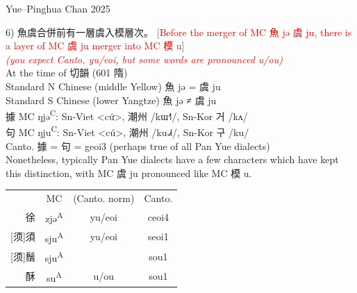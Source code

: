 \documentclass{beamer}
\begin{document}
\begin{frame}[fragile]{Yue–Pinghua \scriptsize{Chan 2025}}

{\small
6) 魚虞合併前有一層虞入模層次。
\textcolor{red}{[Before the merger of MC 魚 jə 虞 ju, there is a layer of MC 虞 ju merger into MC 模 u]\\ \textit{\scriptsize(you expect Canto. yu/eoi, but some words are pronounced u/ou)}}\\
\smallskip
At the time of 切韻 (601 隋)\\
    \quad Standard N Chinese (middle Yellow) 魚 jə = 虞 ju\\
    \quad Standard S Chinese (lower Yangtze) 魚 jə ≠ 虞 ju\\ 
\smallskip
據 MC ŋjə\textsuperscript{C}: Sn-Viet <cứ>, 潮州 /kɯ˧˥/, Sn-Kor 거 /kʌ/\\
句 MC ŋju\textsuperscript{C}: Sn-Viet <cú>, 潮州 /ku˨˩˧/, Sn-Kor 구 /ku/\\ 
\smallskip
Canto. 據 = 句 = geoi3 {\scriptsize(perhaps true of all Pan Yue dialects)}\\
Nonetheless, typically Pan Yue dialects have a few characters which have kept this distinction, with MC 虞 ju pronounced like MC 模 u.\\
\begin{table}
    \flushleft
    \begin{tabular}{r|c c c}
          & MC & (Canto. norm) & Canto.\\
         徐 & zjə\textsuperscript{A} & yu/eoi & ceoi4\\
         {[须]須} & sju\textsuperscript{A} & yu/eoi & seoi1\\
         {[须]鬚} & sju\textsuperscript{A} & & sou1\\
         酥 & su\textsuperscript{A} & u/ou & sou1\\
    \end{tabular}
\end{table}
}
\end{frame}
\end{document}
